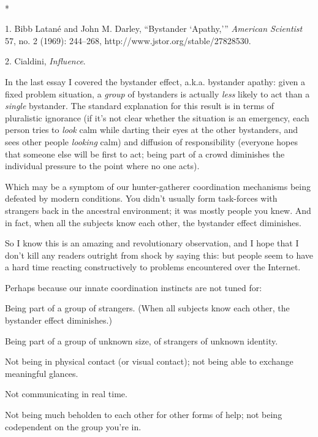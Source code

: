 {\centering
 \ ~
\par}

{\centering
 *
\par}


\bigskip

{
 1. Bibb Latané and John M. Darley, ``Bystander
`Apathy,'''
\textit{American Scientist} 57, no. 2 (1969): 244--268,
http://www.jstor.org/stable/27828530.}

{
 2. Cialdini, \textit{Influence}.}


{
 In the last essay I covered the bystander effect, a.k.a. bystander
apathy: given a fixed problem situation, a \textit{group} of bystanders
is actually \textit{less} likely to act than a \textit{single}
bystander. The standard explanation for this result is in terms of
pluralistic ignorance (if it's not clear whether the
situation is an emergency, each person tries to \textit{look} calm
while darting their eyes at the other bystanders, and sees other people
\textit{looking} calm) and diffusion of responsibility (everyone hopes
that someone else will be first to act; being part of a crowd
diminishes the individual pressure to the point where no one acts). }

{
 Which may be a symptom of our hunter-gatherer coordination
mechanisms being defeated by modern conditions. You
didn't usually form task-forces with strangers back in
the ancestral environment; it was mostly people you knew. And in fact,
when all the subjects know each other, the bystander effect
diminishes.}

{
 So I know this is an amazing and revolutionary observation, and I
hope that I don't kill any readers outright from shock
by saying this: but people seem to have a hard time reacting
constructively to problems encountered over the Internet.}

{
 Perhaps because our innate coordination instincts are not tuned
for:}

{
 Being part of a group of strangers. (When all subjects know each
other, the bystander effect diminishes.)}

{
 Being part of a group of unknown size, of strangers of unknown
identity.}

{
 Not being in physical contact (or visual contact); not being able
to exchange meaningful glances.}

{
 Not communicating in real time.}

{
 Not being much beholden to each other for other forms of help; not
being codependent on the group you're in.}

